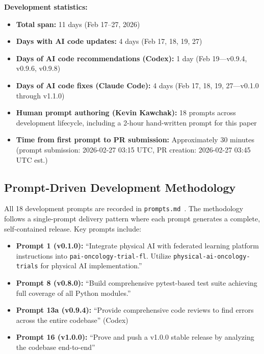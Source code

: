 \documentclass[10pt]{article}
\begin{document}
\textbf{Development statistics:}
\begin{itemize}
  \item \textbf{Total span:} 11 days (Feb 17--27, 2026)
  \item \textbf{Days with AI code updates:} 4 days (Feb 17, 18, 19, 27)
  \item \textbf{Days of AI code recommendations (Codex):} 1 day (Feb 19---v0.9.4, v0.9.6, v0.9.8)
  \item \textbf{Days of AI code fixes (Claude Code):} 4 days (Feb 17, 18, 19, 27---v0.1.0 through v1.1.0)
  \item \textbf{Human prompt authoring (Kevin Kawchak):} 18 prompts across development lifecycle, including a 2-hour hand-written prompt for this paper
  \item \textbf{Time from first prompt to PR submission:} Approximately 30 minutes (prompt submission: 2026-02-27 03:15 UTC, PR creation: 2026-02-27 03:45 UTC est.)
\end{itemize}

\subsection{Prompt-Driven Development Methodology}

All 18 development prompts are recorded in \texttt{prompts.md}~\cite{kawchak2026fl}. The methodology follows a single-prompt delivery pattern where each prompt generates a complete, self-contained release. Key prompts include:
\begin{itemize}
  \item \textbf{Prompt 1 (v0.1.0):} ``Integrate physical AI with federated learning platform instructions into \texttt{pai-oncology-trial-fl}. Utilize \texttt{physical-ai-oncology-trials} for physical AI implementation.''
  \item \textbf{Prompt 8 (v0.8.0):} ``Build comprehensive pytest-based test suite achieving full coverage of all Python modules.''
  \item \textbf{Prompt 13a (v0.9.4):} ``Provide comprehensive code reviews to find errors across the entire codebase'' (Codex)
  \item \textbf{Prompt 16 (v1.0.0):} ``Prove and push a v1.0.0 stable release by analyzing the codebase end-to-end''
\end{itemize}

\end{document}
